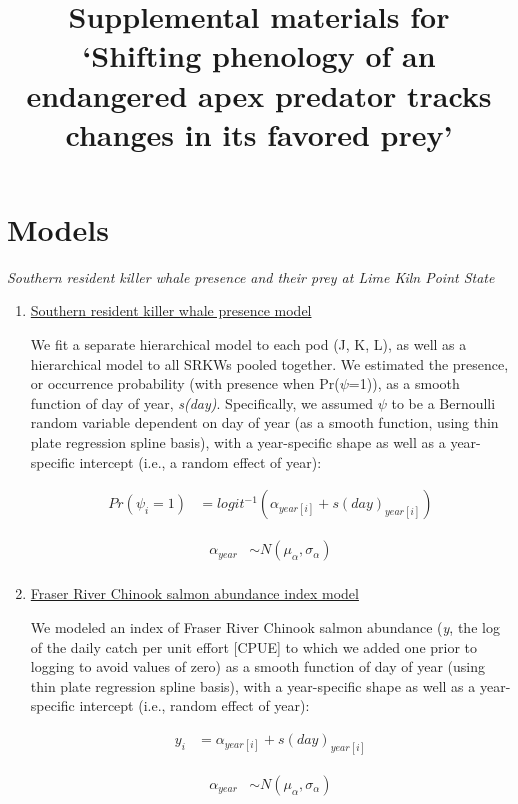\documentclass{article}
\begin{document}



\title{Supplemental materials for `Shifting phenology of an endangered apex predator tracks changes in its favored prey'}
\date{ }
\maketitle
\author{}
\renewcommand{\thetable}{S\arabic{table}}
\renewcommand{\thefigure}{S\arabic{figure}}
\section*{Models}
\emph{Southern resident killer whale presence and their prey at Lime Kiln Point State}
\begin{enumerate}
\item \underline{Southern resident killer whale presence model}
\par We fit a separate hierarchical model to each pod (J, K, L), as well as a hierarchical model to all SRKWs pooled together. We estimated the presence, or occurrence probability (with presence when Pr(\emph{$\psi$}=1)), as a smooth function of day of year, \emph{s(day)}. Specifically, we assumed $\psi$ to be a Bernoulli random variable dependent on day of year (as a smooth function, using thin plate regression spline basis), with a year-specific shape as well as a year-specific intercept (i.e., a random effect of year):


\begin{align*}
Pr(\psi_i = 1) &= logit^{-1} (\alpha_{year[i]} + s(day)_{year[i]})
\end{align*}

\begin{align*}
\alpha_{year} & \sim N(\mu_{\alpha}, \sigma_{\alpha}) \\
\end{align*}


\item \underline{Fraser River Chinook salmon abundance index model}

We modeled an index of Fraser River Chinook salmon abundance (\emph{y}, the log of the daily catch per unit effort [CPUE] to which we added one prior to logging to avoid values of zero) as a smooth function of day of year (using thin plate regression spline basis), with a year-specific shape as well as a year-specific intercept (i.e., random effect of year):


\begin{align*}
y_i &= \alpha_{year[i]} + s(day)_{year[i]}
\end{align*}

\begin{align*}
\alpha_{year} & \sim N(\mu_{\alpha}, \sigma_{\alpha}) \\
\end{align*}

\end{enumerate}
\end{document}
